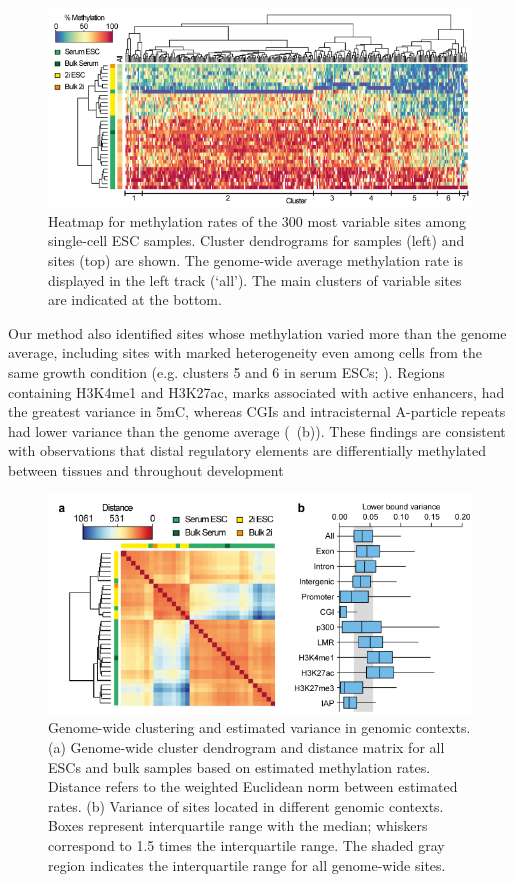 \begin{figure}[htbp!]
\centering
\includegraphics[width=1.0\textwidth]{top300}
\caption[Heatmap of 300 most variable sites.]{Heatmap for methylation rates of the 300 most variable sites among single-cell ESC samples. Cluster dendrograms for samples (left) and sites (top) are shown. The genome-wide average methylation rate is displayed in the left track (`all'). The main clusters of variable sites are indicated at the bottom.}
\label{fig:bs_top300}
\end{figure}

Our method also identified sites whose methylation varied more than the genome average, including sites with marked heterogeneity even among cells from the same growth condition (e.g. clusters 5 and 6 in serum ESCs; ). Regions containing H3K4me1 and H3K27ac, marks associated with active enhancers, had the greatest variance in 5mC, whereas CGIs and intracisternal A-particle repeats had lower variance than the genome average (~(b)). These findings are consistent with observations that distal regulatory elements are differentially methylated between tissues and throughout development~\citep{stadler_dna-binding_2011,ziller_charting_2013,hon_epigenetic_2013}

\begin{figure}[htbp!]
\centering
\includegraphics[width=1.0\textwidth]{clust}
\caption[Genome-wide clustering and estimated variance in genomic contexts.]{Genome-wide clustering and estimated variance in genomic contexts. (a) Genome-wide cluster dendrogram and distance matrix for all ESCs and bulk samples based on estimated methylation rates. Distance refers to the weighted Euclidean norm between estimated rates. (b) Variance of sites located in different genomic contexts. Boxes represent interquartile range with the median; whiskers correspond to 1.5 times the interquartile range. The shaded gray region indicates the interquartile range for all genome-wide sites.}
\label{fig:bs_clust}
\end{figure}
